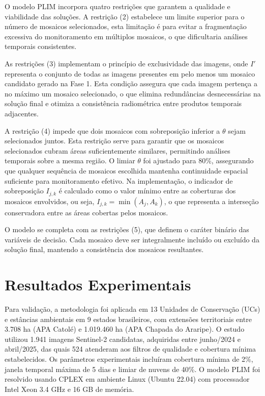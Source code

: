 \documentclass[a4paper,11pt]{article}
\begin{document}
O modelo PLIM incorpora quatro restrições que garantem a qualidade e viabilidade das soluções. A restrição (2) estabelece um limite superior para o número de mosaicos selecionados, esta limitação é para evitar a fragmentação excessiva do monitoramento em múltiplos mosaicos, o que dificultaria análises temporais consistentes.

As restrições (3) implementam o princípio de exclusividade das imagens, onde $I'$ representa o conjunto de todas as imagens presentes em pelo menos um mosaico candidato gerado na Fase 1. Esta condição assegura que cada imagem pertença a no máximo um mosaico selecionado, o que elimina redundâncias desnecessárias na solução final e otimiza a consistência radiométrica entre produtos temporais adjacentes.

A restrição (4) impede que dois mosaicos com sobreposição inferior a $\theta$ sejam selecionados juntos. Esta restrição serve para garantir que os mosaicos selecionados cubram áreas suficientemente similares, permitindo análises temporais sobre a mesma região. O limiar $\theta$ foi ajustado para 80\%, assegurando que qualquer sequência de mosaicos escolhida mantenha continuidade espacial suficiente para monitoramento efetivo. Na implementação, o indicador de sobreposição $I_{j,k}$ é calculado como o valor mínimo entre as coberturas dos mosaicos envolvidos, ou seja, $I_{j,k} = \min(A_j, A_k)$, o que representa a interseção conservadora entre as áreas cobertas pelos mosaicos.

O modelo se completa com as restrições (5), que definem o caráter binário das variáveis de decisão. Cada mosaico deve ser integralmente incluído ou excluído da solução final, mantendo a consistência dos mosaicos resultantes.
\vspace{-7mm}

\section{Resultados Experimentais}
\vspace{-4mm}
Para validação, a metodologia foi aplicada em 13 Unidades de Conservação (UCs) e estâncias
ambientais em 9 estados brasileiros, com extensões territoriais entre 3.708 ha (APA Catolé) e
1.019.460 ha (APA Chapada do Araripe). O estudo utilizou 1.941 imagens Sentinel-2 candidatas, adquiridas entre junho/2024 e abril/2025, das quais 524 atenderam aos filtros de qualidade e cobertura mínima estabelecidos. 
Os parâmetros experimentais incluíram cobertura mínima de 2\%, janela temporal máxima de 5 dias e limiar de
nuvens de 40\%. O modelo PLIM foi resolvido usando CPLEX em ambiente Linux (Ubuntu 22.04) com processador Intel Xeon 3.4 GHz e 16 GB de memória. 
\end{document}
